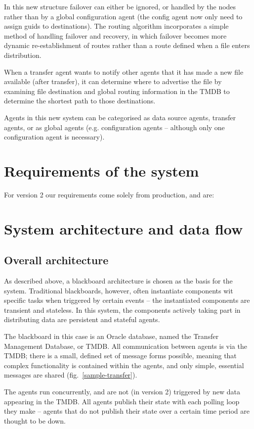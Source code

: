 \documentclass{cmspaper}
\begin{document}
In this new structure failover can either be ignored, or handled by the nodes rather than by a global configuration agent (the config agent now only need to assign guids to destinations).  The routing algorithm incorporates a simple method of handling failover and recovery, in which failover becomes more dynamic re-establishment of routes rather than a route defined when a file enters distribution.

When a transfer agent wants to notify other agents that it has made a new file available (after transfer), it can determine where to advertise the file by examining file destination and global routing information in the TMDB to determine the shortest path to those destinations.

Agents in this new system can be categorised as data source agents, transfer agents, or as global agents (e.g. configuration agents -- although only one configuration agent is necessary).

\section{Requirements of the system}
For version 2 our requirements come solely from production, and are:

\section{System architecture and data flow}
\subsection{Overall architecture}
As described above, a blackboard architecture is chosen as the basis for the system.  Traditional blackboards, however, often instantiate components wit specific tasks when triggered by certain events -- the instantiated components are transient and stateless.  In this system, the components actively taking part in distributing data are persistent and stateful agents. 

The blackboard in this case is an Oracle database, named the Transfer Management Database, or TMDB.  All communication between agents is via the TMDB; there is a small, defined set of message forms possible, meaning that complex functionality is contained within the agents, and only simple, essential messages are shared (fig.~\ref{sample-transfer}).

The agents run concurrently, and are not (in version 2) triggered by new data appearing in the TMDB.  All agents publish their state with each polling loop they make -- agents that do not publish their state over a certain time period are thought to be down.
\end{document}
